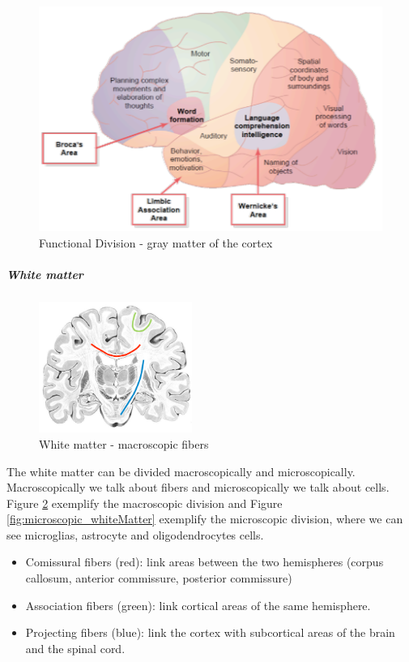 \documentclass[12pt,article,oneside,a4paper]{memoir}
\begin{document}
\begin{figure}
  \centering
  \includegraphics[width=12cm]{imgs/functional_boundaries.png}
  \caption{Functional Division - gray matter of the cortex}
  \label{fig:functionalBoundaries}
\end{figure}

\newpage

\subparagraph{White matter}

\begin{figure}
	\centering
  	\includegraphics[width=5cm]{imgs/macroscopic_whiteMatter.png}
	\caption{White matter - macroscopic fibers}
  	\label{fig:macroscopic_whiteMatter}
\end{figure}

The white matter can be divided macroscopically and microscopically. Macroscopically we talk about fibers and microscopically we talk about cells. Figure \ref{fig:macroscopic_whiteMatter} exemplify the macroscopic division and Figure \ref{fig:microscopic_whiteMatter} exemplify the microscopic division, where we can see microglias, astrocyte and oligodendrocytes cells.

\begin{itemize}
\item Comissural fibers (red): link areas between the two hemispheres (corpus callosum, anterior commissure, posterior commissure)
\item Association fibers (green): link cortical areas of the same hemisphere.
\item Projecting fibers (blue): link the cortex with subcortical areas of the brain and the spinal cord.
\end{itemize}
\end{document}
